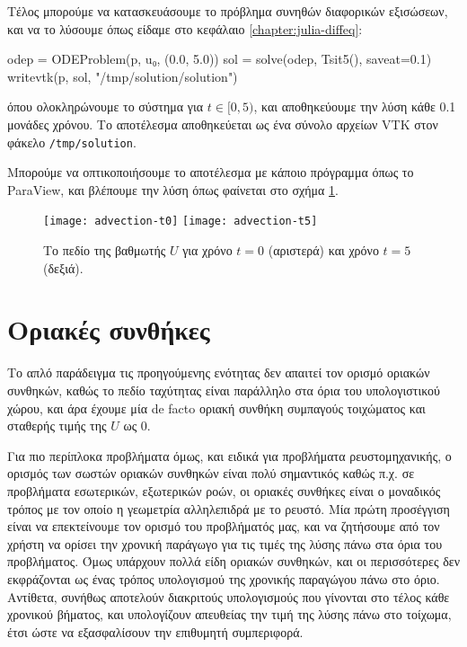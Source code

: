 Τέλος μπορούμε να κατασκευάσουμε το πρόβλημα συνηθών διαφορικών εξισώσεων, και να το λύσουμε όπως είδαμε στο κεφάλαιο \ref{chapter:julia-diffeq}:

{\large
\begin{jllisting}[language=julia,style=jlcodestyle]
odep = ODEProblem(p, u₀, (0.0, 5.0))
sol = solve(odep, Tsit5(), saveat=0.1)
writevtk(p, sol, "/tmp/solution/solution")
\end{jllisting}
}

όπου ολοκληρώνουμε το σύστημα για $t \in [0, 5)$, και αποθηκεύουμε την λύση κάθε 0.1 μονάδες χρόνου.
Το αποτέλεσμα αποθηκεύεται ως ένα σύνολο αρχείων VTK στον φάκελο \texttt{/tmp/solution}.

Μπορούμε να οπτικοποιήσουμε το αποτέλεσμα με κάποιο πρόγραμμα όπως το ParaView, και βλέπουμε την λύση όπως φαίνεται στο σχήμα \ref{fig:advection-plot}.

\begin{figure}[H]
    \centering
    \texttt{[image: advection-t0]}
    \texttt{[image: advection-t5]}
    \caption{Το πεδίο της βαθμωτής $U$ για χρόνο $t = 0$ (αριστερά) και χρόνο $t = 5$ (δεξιά).}
    \label{fig:advection-plot}
\end{figure}

\section{Οριακές συνθήκες}
\label{section:shockwave-bcs}

Το απλό παράδειγμα τις προηγούμενης ενότητας δεν απαιτεί τον ορισμό οριακών συνθηκών, καθώς το πεδίο ταχύτητας είναι παράλληλο στα όρια του υπολογιστικού χώρου, και άρα έχουμε μία de facto οριακή συνθήκη συμπαγούς τοιχώματος και σταθερής τιμής της $U$ ως 0.

Για πιο περίπλοκα προβλήματα όμως, και ειδικά για προβλήματα ρευστομηχανικής, ο ορισμός των σωστών οριακών συνθηκών είναι πολύ σημαντικός καθώς π.χ. σε προβλήματα εσωτερικών, εξωτερικών ροών, οι οριακές συνθήκες είναι ο μοναδικός τρόπος με τον οποίο η γεωμετρία αλληλεπιδρά με το ρευστό.
Μία πρώτη προσέγγιση είναι να επεκτείνουμε τον ορισμό του προβλήματός μας, και να ζητήσουμε από τον χρήστη να ορίσει την χρονική παράγωγο για τις τιμές της λύσης πάνω στα όρια του προβλήματος.
Όμως υπάρχουν πολλά είδη οριακών συνθηκών, και οι περισσότερες δεν εκφράζονται ως ένας τρόπος υπολογισμού της χρονικής παραγώγου πάνω στο όριο.
Αντίθετα, συνήθως αποτελούν διακριτούς υπολογισμούς που γίνονται στο τέλος κάθε χρονικού βήματος, και υπολογίζουν απευθείας την τιμή της λύσης πάνω στο τοίχωμα, έτσι ώστε να εξασφαλίσουν την επιθυμητή συμπεριφορά.

